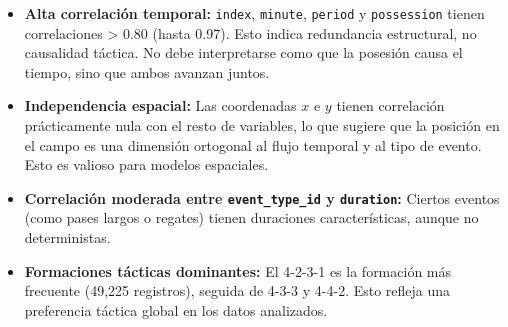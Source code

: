 \documentclass[12pt,a4paper]{article}
\begin{document}
\begin{itemize}
    \item \textbf{Alta correlación temporal:} \texttt{index}, \texttt{minute}, \texttt{period} y \texttt{possession} tienen correlaciones > 0.80 (hasta 0.97). Esto indica redundancia estructural, no causalidad táctica. No debe interpretarse como que la posesión causa el tiempo, sino que ambos avanzan juntos.
    \item \textbf{Independencia espacial:} Las coordenadas \(x\) e \(y\) tienen correlación prácticamente nula con el resto de variables, lo que sugiere que la posición en el campo es una dimensión ortogonal al flujo temporal y al tipo de evento. Esto es valioso para modelos espaciales.
    \item \textbf{Correlación moderada entre \texttt{event\_type\_id} y \texttt{duration}:} Ciertos eventos (como pases largos o regates) tienen duraciones características, aunque no deterministas.
    \item \textbf{Formaciones tácticas dominantes:} El 4-2-3-1 es la formación más frecuente (49,225 registros), seguida de 4-3-3 y 4-4-2. Esto refleja una preferencia táctica global en los datos analizados.
\end{itemize}
\end{document}
